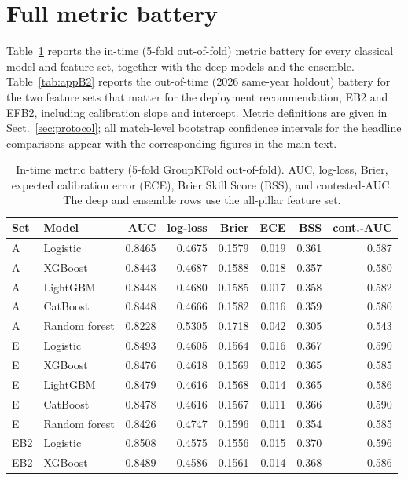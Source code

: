 \documentclass[11pt,a4paper]{article}
\begin{document}
\section{Full metric battery}
\label{app:metrics}

Table~\ref{tab:appB1} reports the in-time (5-fold out-of-fold) metric battery for every classical
model and feature set, together with the deep models and the ensemble. Table~\ref{tab:appB2} reports
the out-of-time (2026 same-year holdout) battery for the two feature sets that matter for the
deployment recommendation, EB2 and EFB2, including calibration slope and intercept. Metric definitions
are given in Sect.~\ref{sec:protocol}; all match-level bootstrap confidence intervals for the headline
comparisons appear with the corresponding figures in the main text.

\begin{table}[t]
\centering
\caption{In-time metric battery (5-fold GroupKFold out-of-fold). AUC, log-loss, Brier, expected
calibration error (ECE), Brier Skill Score (BSS), and contested-AUC. The deep and ensemble rows use
the all-pillar feature set.}
\label{tab:appB1}
\small
\begin{tabular}{llrrrrrr}
\toprule
Set & Model & AUC & log-loss & Brier & ECE & BSS & cont.-AUC \\
\midrule
A & Logistic & 0.8465 & 0.4675 & 0.1579 & 0.019 & 0.361 & 0.587 \\
A & XGBoost & 0.8443 & 0.4687 & 0.1588 & 0.018 & 0.357 & 0.580 \\
A & LightGBM & 0.8448 & 0.4680 & 0.1585 & 0.017 & 0.358 & 0.582 \\
A & CatBoost & 0.8448 & 0.4666 & 0.1582 & 0.016 & 0.359 & 0.580 \\
A & Random forest & 0.8228 & 0.5305 & 0.1718 & 0.042 & 0.305 & 0.543 \\
\midrule
E & Logistic & 0.8493 & 0.4605 & 0.1564 & 0.016 & 0.367 & 0.590 \\
E & XGBoost & 0.8476 & 0.4618 & 0.1569 & 0.012 & 0.365 & 0.585 \\
E & LightGBM & 0.8479 & 0.4616 & 0.1568 & 0.014 & 0.365 & 0.586 \\
E & CatBoost & 0.8478 & 0.4616 & 0.1567 & 0.011 & 0.366 & 0.590 \\
E & Random forest & 0.8426 & 0.4747 & 0.1596 & 0.011 & 0.354 & 0.585 \\
\midrule
EB2 & Logistic & 0.8508 & 0.4575 & 0.1556 & 0.015 & 0.370 & 0.596 \\
EB2 & XGBoost & 0.8489 & 0.4586 & 0.1561 & 0.014 & 0.368 & 0.586 \\

\end{tabular}
\end{table}
\end{document}
